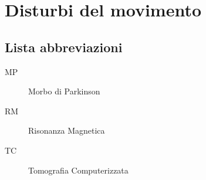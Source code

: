 \chapter{Disturbi del movimento}
\minitoc
\section*{Lista abbreviazioni}
\begin{description}
	\item[MP]{Morbo di Parkinson}
	\item[RM] Risonanza Magnetica
	\item[TC]{Tomografia Computerizzata}
\end{description}
